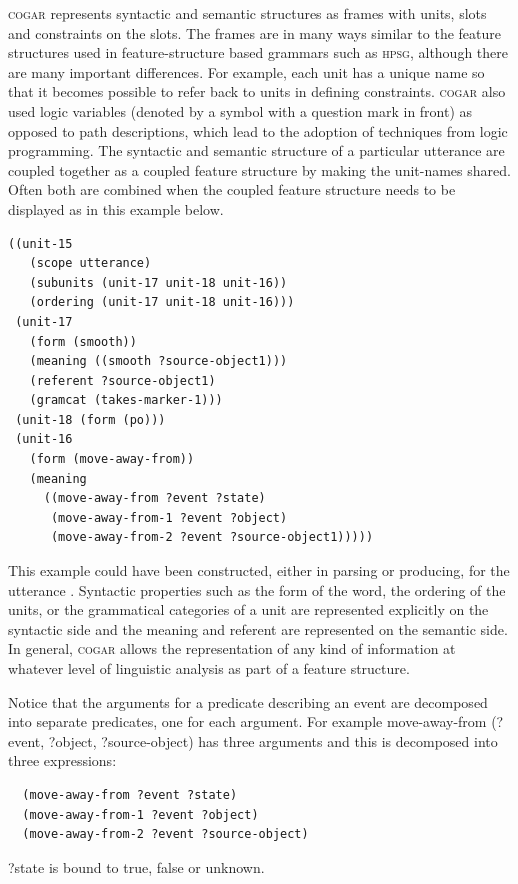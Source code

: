 \textsc{cogar} represents syntactic and semantic structures as frames with units, slots and 
constraints on the slots. The frames are in many ways similar to the feature structures used in feature-structure 
based grammars such as \textsc{hpsg}, although there are many important differences. For example, each unit has a 
unique name so that it becomes possible to refer back to units in defining constraints. \textsc{cogar} also used 
logic variables (denoted by a symbol with a question mark in front) as opposed to path descriptions, which 
lead to the adoption of techniques from logic programming. 
The syntactic and semantic structure of a particular utterance are coupled together as a coupled feature structure 
by making the unit-names shared. Often both are combined when the coupled feature structure needs to be displayed
as in this example below. 
\begin{verbatim}
((unit-15
   (scope utterance)
   (subunits (unit-17 unit-18 unit-16))
   (ordering (unit-17 unit-18 unit-16)))
 (unit-17
   (form (smooth))
   (meaning ((smooth ?source-object1)))
   (referent ?source-object1) 
   (gramcat (takes-marker-1)))
 (unit-18 (form (po)))
 (unit-16 
   (form (move-away-from)) 
   (meaning
     ((move-away-from ?event ?state) 
      (move-away-from-1 ?event ?object)
      (move-away-from-2 ?event ?source-object1)))))
\end{verbatim}
This example could have been constructed, either in parsing or producing, for 
the utterance . Syntactic properties such as the form of the word, 
the ordering of the units, or the grammatical categories of a unit are represented explicitly on the syntactic side and 
the meaning and referent are represented on the semantic side. In general, \textsc{cogar} allows the representation of
any kind of information at whatever level of linguistic analysis as part of a feature structure. 

Notice that the arguments for a predicate describing an event are decomposed into separate predicates, one for 
each argument. For example move-away-from (?event, ?object, ?source-object) has three arguments and this 
is decomposed into three expressions: 
\begin{verbatim}
  (move-away-from ?event ?state) 
  (move-away-from-1 ?event ?object)
  (move-away-from-2 ?event ?source-object)
\end{verbatim}
?state is bound to true, false or unknown. 

